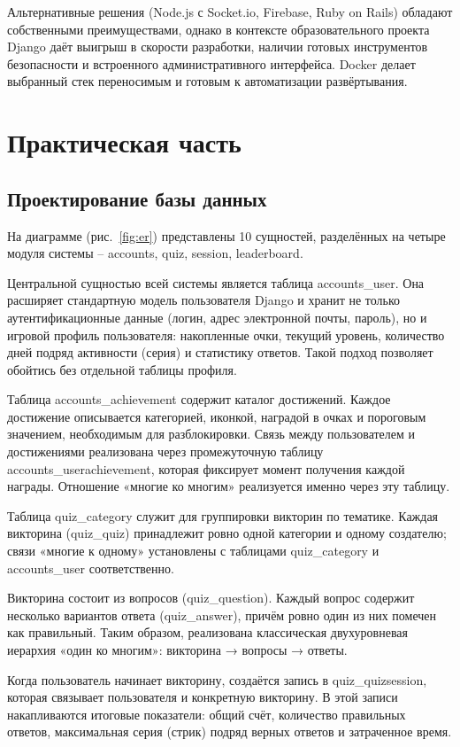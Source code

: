 \documentclass[14pt,a4paper]{extreport}
\begin{document}
Альтернативные решения (Node.js с Socket.io, Firebase, Ruby on Rails) обладают собственными преимуществами, однако в контексте образовательного проекта Django даёт выигрыш в скорости разработки, наличии готовых инструментов безопасности и встроенного административного интерфейса. Docker делает выбранный стек переносимым и готовым к автоматизации развёртывания.

\newpage
\chapter[Глава \thechapter. Практическая часть]{Практическая часть}

\section{Проектирование базы данных}

На диаграмме (рис.~\ref{fig:er}) представлены 10 сущностей, разделённых на четыре модуля системы -- accounts, quiz, session, leaderboard.

Центральной сущностью всей системы является таблица accounts\_user. Она расширяет стандартную модель пользователя Django и хранит не только аутентификационные данные (логин, адрес электронной почты, пароль), но и игровой профиль пользователя: накопленные очки, текущий уровень, количество дней подряд активности (серия) и статистику ответов. Такой подход позволяет обойтись без отдельной таблицы профиля.

Таблица accounts\_achievement содержит каталог достижений. Каждое достижение описывается категорией, иконкой, наградой в очках и пороговым значением, необходимым для разблокировки. Связь между пользователем и достижениями реализована через промежуточную таблицу accounts\_userachievement, которая фиксирует момент получения каждой награды. Отношение «многие ко многим» реализуется именно через эту таблицу.

Таблица quiz\_category служит для группировки викторин по тематике. Каждая викторина (quiz\_quiz) принадлежит ровно одной категории и одному создателю; связи «многие к одному» установлены с таблицами quiz\_category и accounts\_user соответственно.

Викторина состоит из вопросов (quiz\_question). Каждый вопрос содержит несколько вариантов ответа (quiz\_answer), причём ровно один из них помечен как правильный. Таким образом, реализована классическая двухуровневая иерархия «один ко многим»: викторина → вопросы → ответы.

Когда пользователь начинает викторину, создаётся запись в quiz\_quizsession, которая связывает пользователя и конкретную викторину. В этой записи накапливаются итоговые показатели: общий счёт, количество правильных ответов, максимальная серия (стрик) подряд верных ответов и затраченное время.
\end{document}
